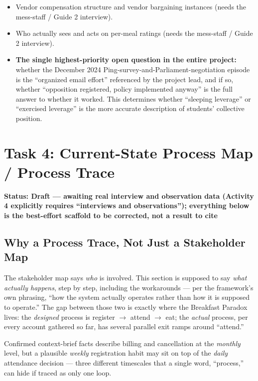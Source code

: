 \documentclass[11pt]{article}
\newcommand{\status}[1]{\noindent\textbf{Status: #1}\par\vspace{4pt}}
\begin{document}
\begin{itemize}
    \item Vendor compensation structure and vendor bargaining instances (needs the
        mess-staff / Guide 2 interview).
    \item Who actually sees and acts on per-meal ratings (needs the mess-staff /
        Guide 2 interview).
    \item \textbf{The single highest-priority open question in the entire project:}
        whether the December 2024 Ping-survey-and-Parliament-negotiation episode is
        the ``organized email effort'' referenced by the project lead, and if so,
        whether ``opposition registered, policy implemented anyway'' is the full
        answer to whether it worked. This determines whether ``sleeping leverage'' or
        ``exercised leverage'' is the more accurate description of students'
        collective position.
\end{itemize}

\newpage

\section{Task 4: Current-State Process Map / Process Trace}
\status{Draft --- awaiting real interview and observation data (Activity 4 explicitly requires ``interviews and observations''); everything below is the best-effort scaffold to be corrected, not a result to cite}

\subsection{Why a Process Trace, Not Just a Stakeholder Map}

The stakeholder map says \emph{who} is involved. This section is supposed to say
\emph{what actually happens}, step by step, including the workarounds --- per the
framework's own phrasing, ``how the system actually operates rather than how it is
supposed to operate.'' The gap between those two is exactly where the Breakfast
Paradox lives: the \emph{designed} process is register $\rightarrow$ attend
$\rightarrow$ eat; the \emph{actual} process, per every account gathered so far, has
several parallel exit ramps around ``attend.''

Confirmed context-brief facts describe billing and cancellation at the
\emph{monthly} level, but a plausible \emph{weekly} registration habit may sit on
top of the \emph{daily} attendance decision --- three different timescales that a
single word, ``process,'' can hide if traced as only one loop.
\end{document}
